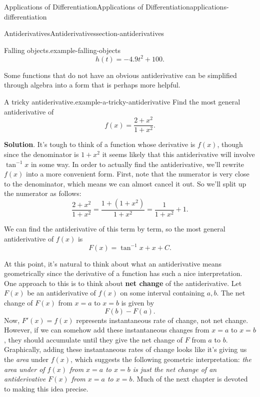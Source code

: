 \documentclass[oneside,10pt,]{book}
\newcommand{\terminology}[1]{\textbf{#1}}
\numberwithin{equation}{section}
\begin{document}
\begin{chapterptx}{Applications of Differentiation}{}{Applications of Differentiation}{}{}{applications-differentiation}
\begin{sectionptx}{Antiderivatives}{}{Antiderivatives}{}{}{section-antiderivatives}
\begin{example}{Falling objects.}{example-falling-objects}
\begin{equation*}
h(t) = -4.9t^{2} + 100\text{.}
\end{equation*}
%
\end{example}
\hypertarget{p-396}{}%
Some functions that do not have an obvious antiderivative can be simplified through algebra into a form that is perhaps more helpful.%
\begin{example}{A tricky antiderivative.}{example-a-tricky-antiderivative}%
\hypertarget{p-397}{}%
Find the most general antiderivative of%
\begin{equation*}
f(x) = \frac{2+x^{2}}{1+x^{2}}.
\end{equation*}
%
\par\smallskip%
\noindent\textbf{Solution}.\hypertarget{solution-89}{}\quad%
\hypertarget{p-398}{}%
It's tough to think of a function whose derivative is \(f(x)\), though since the denominator is \(1+x^{2}\) it seems likely that this antiderivative will involve \(\tan^{-1}x\) in some way. In order to actually find the antiderivative, we'll rewrite \(f(x)\) into a more convenient form. First, note that the numerator is very close to the denominator, which means we can almost cancel it out. So we'll split up the numerator as follows:%
\begin{equation*}
\frac{2+x^{2}}{1+x^{2}} = \frac{1+(1+x^{2})}{1+x^{2}} = \frac{1}{1+x^{2}} + 1.
\end{equation*}
%
\par
\hypertarget{p-399}{}%
We can find the antiderivative of this term by term, so the most general antiderivative of \(f(x)\) is%
\begin{equation*}
F(x) = \tan^{-1}x + x + C.
\end{equation*}
%
\end{example}
\hypertarget{p-400}{}%
At this point, it's natural to think about what an antiderivative means geometrically since the derivative of a function has such a nice interpretation. One approach to this is to think about \terminology{net change} of the antiderivative. Let \(F(x)\) be an antiderivative of \(f(x)\) on some interval containing \(a,b\). The net change of \(F(x)\) from \(x=a\) to \(x=b\) is given by%
\begin{equation*}
F(b) - F(a).
\end{equation*}
Now, \(F'(x) = f(x)\) represents instantaneous rate of change, not net change. However, if we can somehow add these instantaneous changes from \(x=a\) to \(x=b\), they should accumulate until they give the net change of \(F\) from \(a\) to \(b\). Graphically, adding these instantaneous rates of change looks like it's giving us the \emph{area} under \(f(x)\), which suggests the following geometric interpretation: \emph{the area under of \(f(x)\) from \(x=a\) to \(x=b\) is just the net change of an antiderivative \(F(x)\) from \(x=a\) to \(x=b\).} Much of the next chapter is devoted to making this idea precise.%
\end{sectionptx}
\end{chapterptx}
\end{document}
